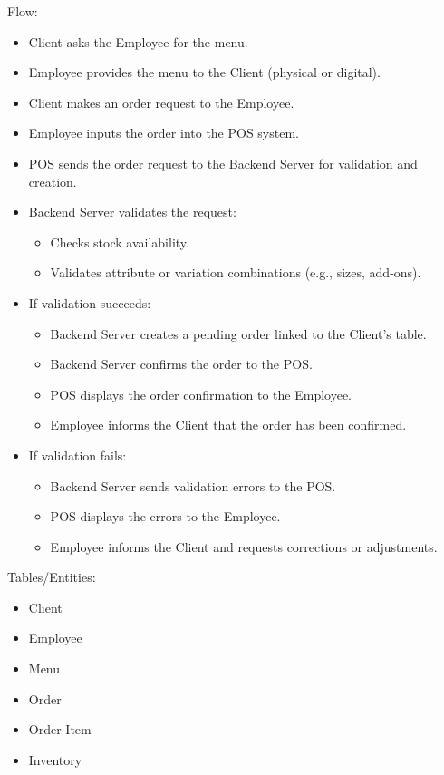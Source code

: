 \documentclass[]{VUMIFTemplateClass}
\begin{document}
Flow:
\begin{itemize}
\setlength{\itemsep}{2pt}
\setlength{\parskip}{0pt}
\setlength{\parsep}{0pt}
\item Client asks the Employee for the menu.
\item Employee provides the menu to the Client (physical or digital).
\item Client makes an order request to the Employee.
\item Employee inputs the order into the POS system.
\item POS sends the order request to the Backend Server for validation and creation.
\item Backend Server validates the request:
\begin{itemize}
\item Checks stock availability.
\item Validates attribute or variation combinations (e.g., sizes, add-ons).
\end{itemize}
\item If validation succeeds:
\begin{itemize}
\item Backend Server creates a pending order linked to the Client’s table.
\item Backend Server confirms the order to the POS.
\item POS displays the order confirmation to the Employee.
\item Employee informs the Client that the order has been confirmed.
\end{itemize}
\item If validation fails:
\begin{itemize}
\item Backend Server sends validation errors to the POS.
\item POS displays the errors to the Employee.
\item Employee informs the Client and requests corrections or adjustments.
\end{itemize}
\end{itemize}

Tables/Entities:
\begin{itemize}
\setlength{\itemsep}{2pt}
\setlength{\parskip}{0pt}
\setlength{\parsep}{0pt}
\item Client
\item Employee
\item Menu
\item Order
\item Order Item 
\item Inventory
\end{itemize}
\end{document}
